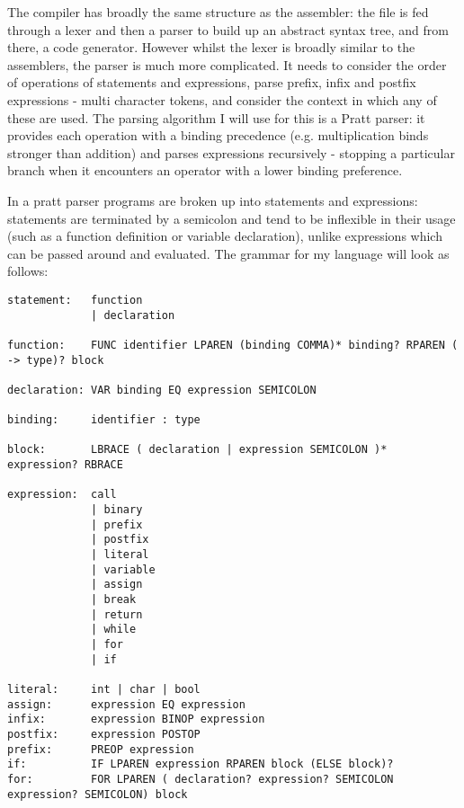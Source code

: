 The compiler has broadly the same structure as the assembler: the file is fed through a lexer and then a parser to build up an abstract syntax tree, and from there, a code generator. However whilst the lexer is broadly similar to the assemblers, the parser is much more complicated. It needs to consider the order of operations of statements and expressions, parse prefix, infix and postfix expressions - multi character tokens, and consider the context in which any of these are used. The parsing algorithm I will use for this is a Pratt parser: it provides each operation with a binding precedence (e.g. multiplication binds stronger than addition) and parses expressions recursively - stopping a particular branch when it encounters an operator with a lower binding preference.

In a pratt parser programs are broken up into statements and expressions: statements are terminated by a semicolon and tend to be inflexible in their usage (such as a function definition or variable declaration), unlike expressions which can be passed around and evaluated. The grammar for my language will look as follows:

\begin{lstlisting}
statement:   function 
             | declaration

function:    FUNC identifier LPAREN (binding COMMA)* binding? RPAREN ( -> type)? block

declaration: VAR binding EQ expression SEMICOLON

binding:     identifier : type

block:       LBRACE ( declaration | expression SEMICOLON )* expression? RBRACE

expression:  call 
             | binary 
             | prefix 
             | postfix 
             | literal 
             | variable 
             | assign 
             | break 
             | return
             | while 
             | for 
             | if

literal:     int | char | bool
assign:      expression EQ expression 
infix:       expression BINOP expression 
postfix:     expression POSTOP
prefix:      PREOP expression
if:          IF LPAREN expression RPAREN block (ELSE block)? 
for:         FOR LPAREN ( declaration? expression? SEMICOLON expression? SEMICOLON) block
\end{lstlisting}

